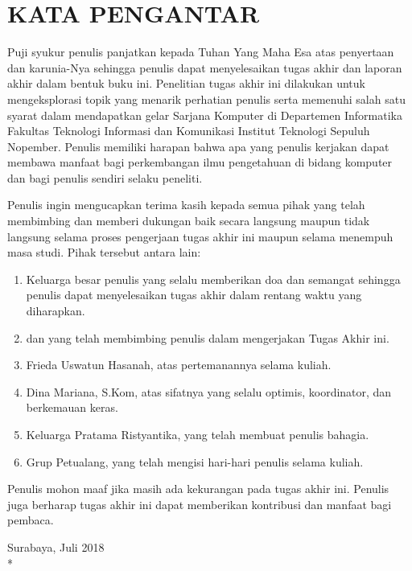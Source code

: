 \chapter {KATA PENGANTAR}

Puji syukur penulis panjatkan kepada Tuhan Yang Maha Esa atas penyertaan dan karunia-Nya sehingga penulis dapat menyelesaikan tugas akhir dan laporan akhir dalam bentuk buku ini. Penelitian tugas akhir ini dilakukan untuk mengeksplorasi topik yang menarik perhatian penulis serta memenuhi salah satu syarat dalam mendapatkan gelar Sarjana Komputer di Departemen Informatika Fakultas Teknologi Informasi dan Komunikasi Institut Teknologi Sepuluh Nopember. Penulis memiliki harapan bahwa apa yang penulis kerjakan dapat membawa manfaat bagi perkembangan ilmu pengetahuan di bidang komputer dan bagi penulis sendiri selaku peneliti.

Penulis ingin mengucapkan terima kasih kepada semua pihak yang telah membimbing dan memberi dukungan baik secara langsung maupun tidak langsung selama proses pengerjaan tugas akhir ini maupun selama menempuh masa studi. Pihak tersebut antara lain:

\begin {enumerate}
    \item Keluarga besar penulis yang selalu memberikan doa dan semangat sehingga penulis dapat menyelesaikan tugas akhir dalam rentang waktu yang diharapkan. 
    \item \pembimbingsatu dan \pembimbingdua yang telah membimbing penulis dalam mengerjakan Tugas Akhir ini.
    \item Frieda Uswatun Hasanah, atas pertemanannya selama kuliah.
    \item Dina Mariana, S.Kom, atas sifatnya yang selalu optimis, koordinator, dan berkemauan keras.
    \item Keluarga Pratama Ristyantika, yang telah membuat penulis bahagia.
    \item Grup Petualang, yang telah mengisi hari-hari penulis selama kuliah.
\end {enumerate}

Penulis mohon maaf jika masih ada kekurangan pada tugas akhir ini. Penulis juga berharap tugas akhir ini dapat memberikan kontribusi dan manfaat bagi pembaca.

\begin{flushright}
Surabaya, Juli 2018 \\*
\vspace{5em}
\penulis
\end{flushright}
